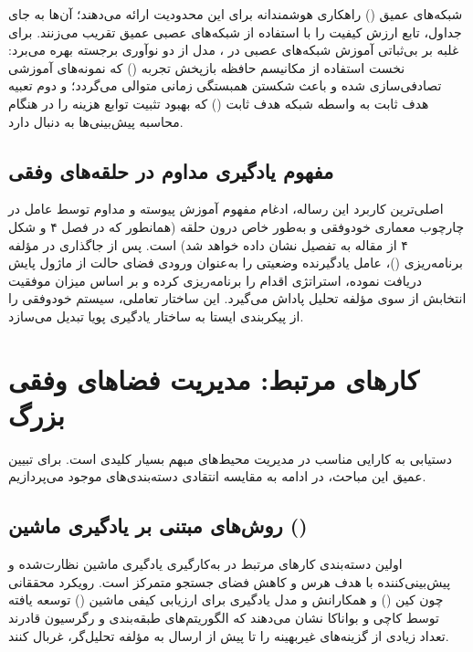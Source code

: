 \documentclass[oneside,openany,phd]{TMU-Thesis}
\begin{document}
شبکه‌های  عمیق () راهکاری هوشمندانه برای این محدودیت ارائه می‌دهند؛ آن‌ها به جای جداول، تابع ارزش کیفیت  را با استفاده از شبکه‌های عصبی عمیق تقریب می‌زنند. برای غلبه بر بی‌ثباتی آموزش شبکه‌های عصبی در ، مدل  از دو نوآوری برجسته بهره می‌برد: نخست استفاده از مکانیسم حافظه بازپخش تجربه () که نمونه‌های آموزشی تصادفی‌سازی شده و باعث شکستن همبستگی زمانی متوالی می‌گردد؛ و دوم تعبیه هدف ثابت به واسطه شبکه هدف ثابت () که بهبود تثبیت توابع هزینه را در هنگام محاسبه پیش‌بینی‌ها به دنبال دارد.

\subsection{مفهوم یادگیری مداوم در حلقه‌های وفقی}

اصلی‌ترین کاربرد این رساله، ادغام مفهوم آموزش پیوسته و مداوم توسط عامل  در چارچوب معماری خودوفقی و به‌طور خاص درون حلقه  (همانطور که در فصل ۴ و شکل ۴ از مقاله \cite{RS_DRL_Article} به تفصیل نشان داده خواهد شد) است. پس از جاگذاری در مؤلفه برنامه‌ریزی ()، عامل یادگیرنده وضعیتی را به‌عنوان ورودی فضای حالت از ماژول پایش دریافت نموده، استراتژی اقدام را برنامه‌ریزی کرده و بر اساس میزان موفقیت انتخابش از سوی مؤلفه تحلیل پاداش می‌گیرد. این ساختار تعاملی، سیستم خودوفقی را از پیکربندی ایستا به ساختار یادگیری پویا تبدیل می‌سازد.

\section{کارهای مرتبط: مدیریت فضاهای وفقی بزرگ}

دستیابی به کارایی مناسب در مدیریت محیط‌های مبهم بسیار کلیدی است. برای تبیین عمیق این مباحث، در ادامه به مقایسه انتقادی دسته‌بندی‌های موجود می‌پردازیم.

\subsection{روش‌های مبتنی بر یادگیری ماشین ()}

اولین دسته‌بندی کارهای مرتبط در به‌کارگیری یادگیری ماشین نظارت‌شده و پیش‌بینی‌کننده با هدف هرس و کاهش فضای جستجو متمرکز است. رویکرد محققانی چون کین () و همکارانش \cite{quin2019efficient,quin2022reducing} و مدل یادگیری برای ارزیابی کیفی ماشین () توسعه یافته توسط کاچی و بواناکا \cite{kachi2023hybrid} نشان می‌دهند که الگوریتم‌های طبقه‌بندی و رگرسیون قادرند تعداد زیادی از گزینه‌های غیربهینه را تا پیش از ارسال به مؤلفه تحلیل‌گر، غربال کنند.
\end{document}
